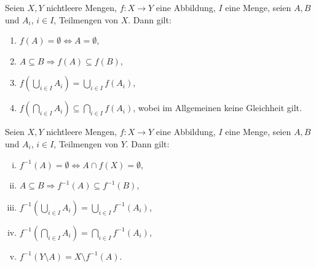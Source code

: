 \begin{theorem}
    Seien $X,Y$ nichtleere Mengen, $f:X \to Y$ eine Abbildung, $I$ eine Menge, seien $A,B$ und $A_i$, $i \in I$, Teilmengen von $X$. Dann gilt: 
    \begin{enumerate}
        \item
        $f(A) = \emptyset \iff A = \emptyset$, 
        \item 
        $A \subseteq B \Rightarrow f(A) \subseteq f(B)$,
        \item 
        $ f(\bigcup_{i \in I}A_i) = \bigcup_{i \in I}f(A_i)$,
        \item 
        $ f(\bigcap_{i \in I}A_i) \subseteq \bigcap_{i \in I}f(A_i)$, wobei im Allgemeinen keine Gleichheit gilt. 
    \end{enumerate}
\end{theorem}

\begin{proof*}
\end{proof*}

\begin{theorem}
    Seien $X,Y$ nichtleere Mengen, $f:X \to Y$ eine Abbildung, $I$ eine Menge, seien $A,B$ und $A_i$, $i \in I$, Teilmengen von $Y$. Dann gilt: 
    \begin{enumerate}[(i)]
        \item 
        $f^{-1}(A) = \emptyset \iff A \cap f(X) = \emptyset$,
        \item 
        $A \subseteq B \Rightarrow f^{-1}(A) \subseteq f^{-1}(B)$,
        \item 
        $f^{-1}(\bigcup_{i \in I}A_i) = \bigcup_{i \in I}f^{-1}(A_i)$,
        \item 
        $f^{-1}(\bigcap_{i \in I}A_i) = \bigcap_{i \in I}f^{-1}(A_i)$,
        \item 
        $f^{-1}(Y \setminus A) = X \setminus f^{-1}(A)$.
    \end{enumerate}
\end{theorem}

\begin{proof*}
\end{proof*}

